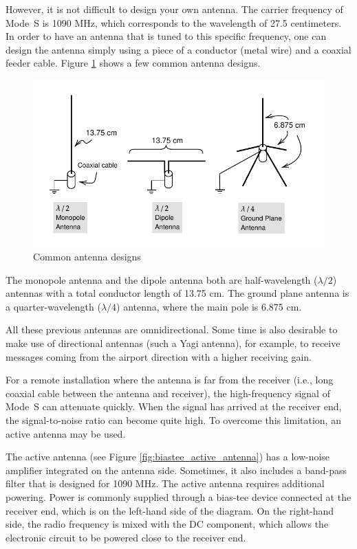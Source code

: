 However, it is not difficult to design your own antenna. The carrier frequency of Mode~S is 1090 MHz, which corresponds to the wavelength of 27.5 centimeters. In order to have an antenna that is tuned to this specific frequency, one can design the antenna simply using a piece of a conductor (metal wire) and a coaxial feeder cable. Figure \ref{fig:antennas} shows a few common antenna designs.

\begin{figure}[ht]
  \centering
  \includegraphics[scale=0.95]{figures/quickstart/antennas.pdf}
  \caption{Common antenna designs}
  \label{fig:antennas}
\end{figure}

The monopole antenna and the dipole antenna both are half-wavelength ($\lambda/2$) antennas with a total conductor length of 13.75 cm. The ground plane antenna is a quarter-wavelength ($\lambda/4$) antenna, where the main pole is 6.875 cm.

All these previous antennas are omnidirectional. Some time is also desirable to make use of directional antennas (such a Yagi antenna), for example, to receive messages coming from the airport direction with a higher receiving gain.

For a remote installation where the antenna is far from the receiver (i.e., long coaxial cable between the antenna and receiver), the high-frequency signal of Mode~S can attenuate quickly. When the signal has arrived at the receiver end, the signal-to-noise ratio can become quite high. To overcome this limitation, an active antenna may be used.

The active antenna (see Figure \ref{fig:biastee_active_antenna}) has a low-noise amplifier integrated on the antenna side. Sometimes, it also includes a band-pass filter that is designed for 1090 MHz. The active antenna requires additional powering. Power is commonly supplied through a bias-tee device connected at the receiver end, which is on the left-hand side of the diagram. On the right-hand side, the radio frequency is mixed with the DC component, which allows the electronic circuit to be powered close to the receiver end.

